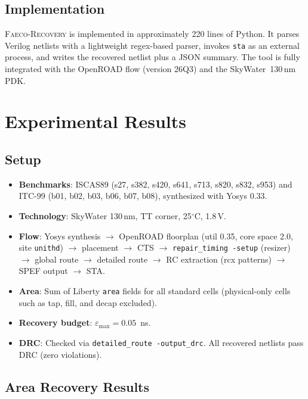 \documentclass[journal]{IEEEtran}
\begin{document}
\subsection{Implementation}

\textsc{Faeco-Recovery} is implemented in approximately 220 lines of
Python. It parses Verilog netlists with a lightweight regex-based parser,
invokes \texttt{sta} as an external process, and writes the recovered
netlist plus a JSON summary. The tool is fully integrated with the
OpenROAD flow (version 26Q3) and the SkyWater~130\,nm PDK.

\section{Experimental Results}

\subsection{Setup}

\begin{itemize}
\item \textbf{Benchmarks}: ISCAS89 (s27, s382, s420, s641, s713, s820,
s832, s953) and ITC-99 (b01, b02, b03, b06, b07, b08), synthesized with Yosys 0.33.
\item \textbf{Technology}: SkyWater 130\,nm, TT corner, 25$^\circ$C,
1.8\,V.
\item \textbf{Flow}: Yosys synthesis $\to$ OpenROAD floorplan (util
0.35, core space 2.0, site \texttt{unithd}) $\to$ placement $\to$ CTS
$\to$ \texttt{repair\_timing -setup} (resizer) $\to$ global route $\to$
detailed route $\to$ RC extraction (rcx patterns) $\to$ SPEF output $\to$
STA.
\item \textbf{Area}: Sum of Liberty \texttt{area} fields for all standard
cells (physical-only cells such as tap, fill, and decap excluded).
\item \textbf{Recovery budget}: $\varepsilon_{\text{max}} = 0.05$~ns.
\item \textbf{DRC}: Checked via \texttt{detailed\_route -output\_drc}.
All recovered netlists pass DRC (zero violations).
\end{itemize}

\subsection{Area Recovery Results}
\end{document}
